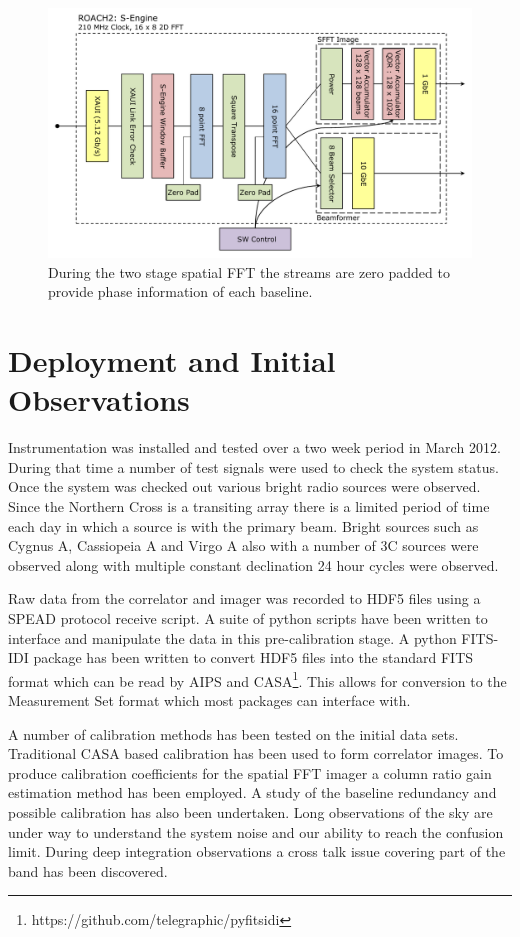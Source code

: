 \documentclass[useAMS,macros,usenatbib,onecolumn]{mn2e}
\begin{document}
\begin{figure}
    \centering
    \includegraphics[scale=0.6]{graphics/crop_sengine_block.pdf}
    \caption{During the two stage spatial FFT the streams are zero padded to provide phase information of each baseline.}
    \label{fig:seng_block}
\end{figure}

\section{Deployment and Initial Observations}
\label{observations}

Instrumentation was installed and tested over a two week period in March 2012.
During that time a number of test signals were used to check the system status.
Once the system was checked out various bright radio sources were observed.
Since the Northern Cross is a transiting array there is a limited period of time each day in which a source is with the primary beam.
Bright sources such as Cygnus A, Cassiopeia A and Virgo A also with a number of 3C sources were observed along with multiple constant declination 24 hour cycles were observed.

Raw data from the correlator and imager was recorded to HDF5 files using a SPEAD protocol receive script.
A suite of python scripts have been written to interface and manipulate the data in this pre-calibration stage.
A python FITS-IDI package has been written to convert HDF5 files into the standard FITS format which can be read by AIPS and CASA\footnote{https://github.com/telegraphic/pyfitsidi}.
This allows for conversion to the Measurement Set format which most packages can interface with.

A number of calibration methods has been tested on the initial data sets.
Traditional CASA based calibration has been used to form correlator images.
To produce calibration coefficients for the spatial FFT imager a column ratio gain estimation method has been employed.
A study of the baseline redundancy and possible calibration has also been undertaken.
Long observations of the sky are under way to understand the system noise and our ability to reach the confusion limit.
During deep integration observations a cross talk issue covering part of the band has been discovered.
\end{document}

